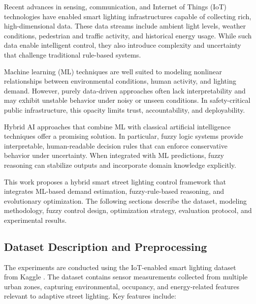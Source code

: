 \documentclass[conference]{IEEEtran}
\begin{document}
Recent advances in sensing, communication, and Internet of Things (IoT) technologies have enabled smart lighting infrastructures capable of collecting rich, high-dimensional data. These data streams include ambient light levels, weather conditions, pedestrian and traffic activity, and historical energy usage. While such data enable intelligent control, they also introduce complexity and uncertainty that challenge traditional rule-based systems.

Machine learning (ML) techniques are well suited to modeling nonlinear relationships between environmental conditions, human activity, and lighting demand. However, purely data-driven approaches often lack interpretability and may exhibit unstable behavior under noisy or unseen conditions. In safety-critical public infrastructure, this opacity limits trust, accountability, and deployability.

Hybrid AI approaches that combine ML with classical artificial intelligence techniques offer a promising solution. In particular, fuzzy logic systems provide interpretable, human-readable decision rules that can enforce conservative behavior under uncertainty. When integrated with ML predictions, fuzzy reasoning can stabilize outputs and incorporate domain knowledge explicitly.

This work proposes a hybrid smart street lighting control framework that integrates ML-based demand estimation, fuzzy-rule-based reasoning, and evolutionary optimization. The following sections describe the dataset, modeling methodology, fuzzy control design, optimization strategy, evaluation protocol, and experimental results.

\subsection{Dataset Description and Preprocessing}
The experiments are conducted using the IoT-enabled smart lighting dataset from Kaggle \cite{smartlighting_dataset}. The dataset contains sensor measurements collected from multiple urban zones, capturing environmental, occupancy, and energy-related features relevant to adaptive street lighting. Key features include:
\end{document}
